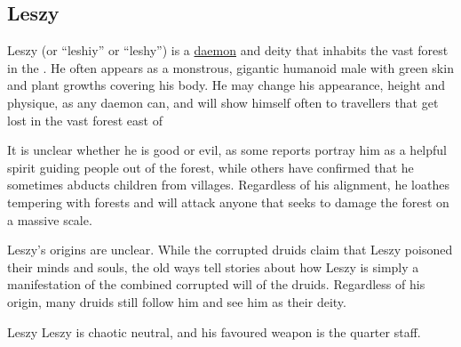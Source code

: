 \subsection{Leszy}
\label{sec:Leszy}

Leszy (or ``leshiy'' or ``leshy'') is a \hyperref[sec:Daemons]{daemon} and
deity that inhabits the vast forest in the . He often
appears as a monstrous, gigantic humanoid male with green skin and plant
growths covering his body. He may change his appearance, height and physique,
as any daemon can, and will show himself often to travellers that get lost in
the vast forest east of 

It is unclear whether he is good or evil, as some reports portray him as a
helpful spirit guiding people out of the forest, while others have confirmed
that he sometimes abducts children from villages. Regardless of his alignment,
he loathes tempering with forests and will attack anyone that seeks to damage
the forest on a massive scale.

Leszy's origins are unclear. While the corrupted druids claim that Leszy
poisoned their minds and souls, the old ways tell stories about how Leszy is
simply a manifestation of the combined corrupted will of the druids. Regardless
of his origin, many druids still follow him and see him as their deity.

\begin{35e}{Leszy}
  Leszy is chaotic neutral, and his favoured weapon is the quarter staff.
\end{35e}
